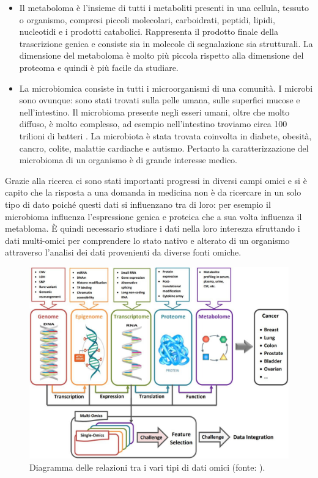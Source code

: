 \documentclass[12pt,italian]{report}
\begin{document}
\begin{itemize}
		\item Il metaboloma è l'insieme di tutti i metaboliti presenti in una cellula, tessuto o organismo, compresi piccoli molecolari, carboidrati, peptidi, lipidi, nucleotidi e i prodotti catabolici. Rappresenta il prodotto finale della trascrizione genica e consiste sia in molecole di segnalazione sia strutturali. La dimensione del metaboloma è molto più piccola rispetto alla dimensione del proteoma e quindi è più facile da studiare.
		
		\item La microbiomica consiste in tutti i microorganismi di una comunità. I microbi sono ovunque: sono stati trovati sulla pelle umana, sulle superfici mucose e nell'intestino. Il microbioma presente negli esseri umani, oltre che molto diffuso, è molto complesso, ad esempio nell'intestino troviamo circa 100 trilioni di batteri \cite{microbiota}.
		La microbiota è stata trovata coinvolta in diabete, obesità, cancro, colite, malattie cardiache e autismo. Pertanto la caratterizzazione del microbioma di un organismo è di grande interesse medico.
	\end{itemize}
	
	Grazie alla ricerca ci sono stati importanti progressi in diversi campi omici e si è capito che la risposta a una domanda in medicina non è da ricercare in un solo tipo di dato poiché questi dati si influenzano tra di loro: per esempio il microbioma influenza l'espressione genica e proteica che a sua volta influenza il metabloma. È quindi necessario studiare i dati nella loro interezza sfruttando i dati multi-omici per comprendere lo stato nativo e alterato di un organismo attraverso l'analisi dei dati provenienti da diverse fonti omiche.
	
	\begin{figure}[t]
		\centering
		\includegraphics[width=0.9\linewidth]{immagini/multi-omicsData}
		\caption{Diagramma delle relazioni tra i vari tipi di dati omici (fonte: \cite{MOMENI2020103466}).}
		\label{fig:multi-omics}
	\end{figure}
	
\end{document}
